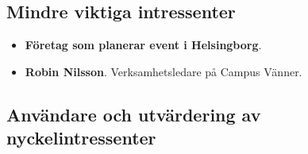 \documentclass[12pt]{article}
\begin{document}
    \subsection{Mindre viktiga intressenter}
    \begin{itemize}
            \item \textbf{Företag som planerar event i Helsingborg}.
                \\
            \item \textbf{Robin Nilsson}. Verksamhetsledare på Campus Vänner.
            
    \end{itemize}
    
    \subsection{Användare och utvärdering av nyckelintressenter}
    
\end{document}
